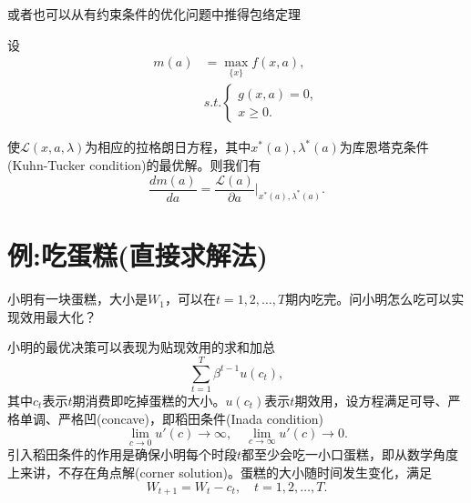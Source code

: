 或者也可以从有约束条件的优化问题中推得包络定理
\begin{theorem}
  \label{theorem:envelope-theorem-constraint}
    设
    \begin{equation*}
      \begin{split}
        m(a) & = \max_{\{x\}} f(x,a), \\
        & s.t. \begin{cases}
        g(x,a)=0, \\
        x \ge 0.
        \end{cases}
      \end{split}
    \end{equation*}

    使$\mathcal{L} \left( x,a,\lambda \right)$为相应的拉格朗日方程，其中$x^{*}(a), \lambda^{*}(a)$为库恩塔克条件(Kuhn-Tucker condition)的最优解。则我们有
    \begin{equation}
      \label{eq:envelope-theorem-constraint}
      \frac{d m(a)}{d a} = \frac{\mathcal{L}(a)}{\partial a} \Big|_{x^{*}(a), \lambda^{*}(a)}.
    \end{equation}
\end{theorem}

\section{例:吃蛋糕(直接求解法)}
\label{sec:dp-cake}
小明有一块蛋糕，大小是$W_{1}$，可以在$t=1,2,\ldots,T$期内吃完。问小明怎么吃可以实现效用最大化？

小明的最优决策可以表现为贴现效用的求和加总
\begin{equation*}
  \sum_{t=1}^{T} \beta^{t-1} u(c_t),
\end{equation*}
其中$c_{t}$表示$t$期消费即吃掉蛋糕的大小。$u(c_{t})$表示$t$期效用，设方程满足可导、严格单调、严格凹(concave)，即稻田条件(Inada condition)\citep{Inada1963}
\begin{equation*}
  \lim_{c \rightarrow 0} u'(c) \rightarrow \infty, \quad \lim_{c \rightarrow \infty} u'(c) \rightarrow 0.
\end{equation*}
引入稻田条件的作用是确保小明每个时段$t$都至少会吃一小口蛋糕，即从数学角度上来讲，不存在角点解(corner solution)。蛋糕的大小随时间发生变化，满足
\begin{equation}
  \label{eq:dp-cake-size-motion}
  W_{t+1} = W_{t} - c_{t}, \quad t = 1,2,\ldots, T.
\end{equation}

